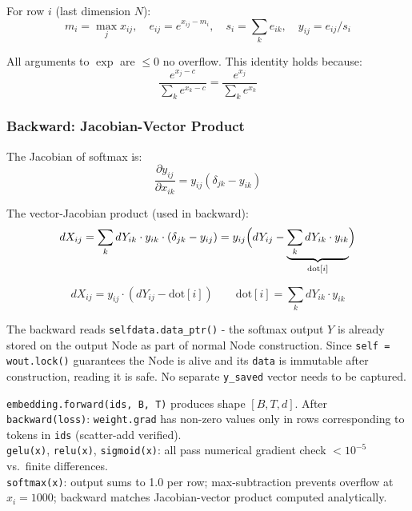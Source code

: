 \documentclass[12pt, a4paper]{article}
\begin{document}
For row \(i\) (last dimension \(N\)):
\[
  m_i = \max_j x_{ij}, \quad
  e_{ij} = e^{x_{ij} - m_i}, \quad
  s_i = \textstyle\sum_k e_{ik}, \quad
  y_{ij} = e_{ij} / s_i
\]

All arguments to \(\exp\) are \(\leq 0\)  no overflow.  This identity holds
because:
\[
  \frac{e^{x_j - c}}{\sum_k e^{x_k - c}} = \frac{e^{x_j}}{\sum_k e^{x_k}}
\]

\subsubsection{Backward: Jacobian-Vector Product}

The Jacobian of softmax is:
\[
  \frac{\partial y_{ij}}{\partial x_{ik}} = y_{ij}(\delta_{jk} - y_{ik})
\]

The vector-Jacobian product (used in backward):
\[
  dX_{ij} = \sum_k dY_{ik} \cdot y_{ik} \cdot (\delta_{jk} - y_{ij})
           = y_{ij}\Bigl(dY_{ij} - \underbrace{\sum_k dY_{ik} \cdot y_{ik}}_{\text{dot}[i]}\Bigr)
\]

\[
  \boxed{dX_{ij} = y_{ij} \cdot (dY_{ij} - \text{dot}[i])}
  \qquad
  \text{dot}[i] = \sum_k dY_{ik} \cdot y_{ik}
\]

\begin{tcolorbox}[interviewbox, title={Interview: Why doesn't the saved-activation approach need an extra buffer?}]
  The backward reads \texttt{self\textrightarrow data.data\_ptr()} - the
  softmax output \(Y\) is already stored on the output Node as part of normal
  Node construction.  Since \texttt{self = wout.lock()} guarantees the Node
  is alive and its \texttt{data} is immutable after construction, reading it
  is safe.  No separate \texttt{y\_saved} vector needs to be captured.
\end{tcolorbox}

\begin{tcolorbox}[exitbox, title={Step 2.2 - Exit Criterion (met)}]
  \texttt{embedding.forward(ids, B, T)} produces shape \([B, T, d]\).
  After \texttt{backward(loss)}: \texttt{weight.grad} has non-zero values
  only in rows corresponding to tokens in \texttt{ids} (scatter-add verified).\\[0.4em]
  \texttt{gelu(x)}, \texttt{relu(x)}, \texttt{sigmoid(x)}: all pass
  numerical gradient check \(<10^{-5}\) vs.\ finite differences.\\[0.4em]
  \texttt{softmax(x)}: output sums to 1.0 per row; max-subtraction prevents
  overflow at \(x_i = 1000\); backward matches Jacobian-vector product
  computed analytically.
\end{tcolorbox}
\end{document}

